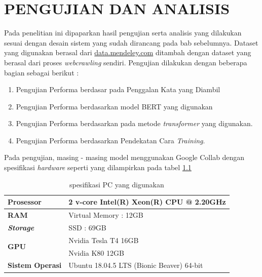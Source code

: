 \chapter{PENGUJIAN DAN ANALISIS}
\label{chap:pengujiananalisis}

Pada penelitian ini dipaparkan hasil pengujian serta analisis yang dilakukan sesuai dengan desain sistem yang sudah dirancang pada bab sebelumnya. Dataset yang digunakan berasal dari \url{data.mendeley.com} ditambah dengan dataset yang berasal dari proses \textit{webcrawling} sendiri. Pengujian dilakukan dengan beberapa bagian sebagai berikut :

\begin{enumerate}[nolistsep]
    \item Pengujian Performa berdasar pada Penggalan Kata yang Diambil
    \item Pengujian Performa berdasarkan model BERT yang digunakan
    \item Pengujian Performa berdasarkan pada metode \textit{transformer}  yang digunakan.
    \item Pengujian Performa berdasarkan Pendekatan Cara \textit{Training}.
\end{enumerate}

Pada pengujian, masing - masing model menggunakan Google Collab dengan spesifikasi \textit{hardware} seperti yang dilampirkan pada tabel \ref{tab:specs_collab}

\begin{table}[h]
    \caption{spesifikasi PC yang digunakan}
    \label{tab:specs_collab}
    \centering
    \begin{tabular}{|l|l|}
        \hline
        \textbf{Prosessor}            & 2 v-core Intel(R) Xeon(R) CPU @ 2.20GHz   \\ \hline
        \textbf{RAM}                  & Virtual Memory : 12GB                     \\ \hline
        \textit{\textbf{Storage}}     & SSD : 69GB                                \\ \hline
        \multirow{2}{*}{\textbf{GPU}} & Nvidia Tesla T4 16GB                      \\ \cline{2-2}
                                      & Nvidia K80 12GB                           \\ \hline
        \textbf{Sistem Operasi}       & Ubuntu 18.04.5 LTS (Bionic Beaver) 64-bit \\ \hline
    \end{tabular}
\end{table}

